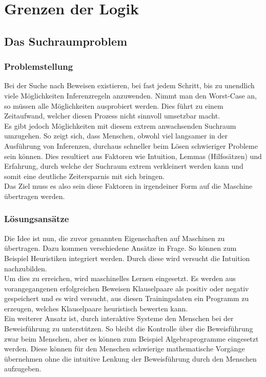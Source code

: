 
\chapter{Grenzen der Logik}
\label{Grenzen der Logik}



\section{Das Suchraumproblem}
\subsection{Problemstellung}
Bei der Suche nach Beweisen existieren, bei fast jedem Schritt, bis zu unendlich viele Möglichkeiten Inferenzregeln anzuwenden.
Nimmt man den Worst-Case an, so müssen alle Möglichkeiten ausprobiert werden. Dies führt zu einem Zeitaufwand, welcher diesen Prozess nicht sinnvoll umsetzbar macht. \\
Es gibt jedoch Möglichkeiten mit diesem extrem anwachsenden Suchraum umzugehen.
So zeigt sich, dass Menschen, obwohl viel langsamer in der Ausführung von Inferenzen, durchaus schneller beim Lösen schwieriger Probleme sein können.
Dies resultiert aus Faktoren wie Intuition, Lemmas (Hilfssätzen) und Erfahrung, durch welche der Suchraum extrem verkleinert werden kann und somit eine deutliche Zeitersparnis mit sich bringen.\\
Das Ziel muss es also sein diese Faktoren in irgendeiner Form auf die Maschine übertragen werden.

\subsection{Lösungsansätze} 
Die Idee ist nun, die zuvor genannten Eigenschaften auf Maschinen zu übertragen.
Dazu kommen verschiedene Ansätze in Frage. So können zum Beispiel Heuristiken integriert werden. Durch diese wird versucht die Intuition nachzubilden.\\
Um dies zu erreichen, wird maschinelles Lernen eingesetzt. Es werden aus vorangegangenen erfolgreichen Beweisen Klauselpaare als positiv oder negativ gespeichert und es wird versucht, aus diesen Trainingsdaten ein Programm zu erzeugen, welches Klauselpaare heuristisch bewerten kann.\\
Ein weiterer Ansatz ist, durch interaktive Systeme den Menschen bei der Beweisführung zu unterstützen. So bleibt die Kontrolle über die Beweisführung zwar beim Menschen, aber es können zum Beispiel Algebraprogramme eingesetzt werden. Diese können für den Menschen schwierige mathematische Vorgänge übernehmen ohne die intuitive Lenkung der Beweisführung durch den Menschen aufzugeben.

